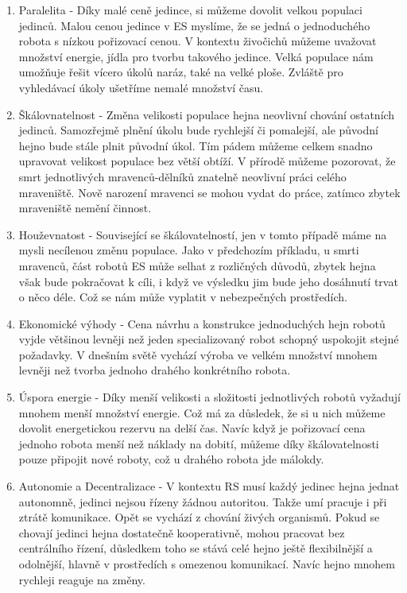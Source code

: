     \begin{enumerate}
        \item Paralelita - Díky malé ceně jedince, si můžeme dovolit velkou populaci jedinců. Malou cenou jedince v ES myslíme, že se jedná o jednoduchého robota s nízkou pořizovací cenou. V kontextu živočichů můžeme uvažovat množství energie, jídla pro tvorbu takového jedince. Velká populace nám umožňuje řešit vícero úkolů naráz, také na velké ploše. Zvláště pro vyhledávací úkoly ušetříme nemalé množství času. 
        \item Škálovnatelnost - Změna velikosti populace hejna neovlivní chování ostatních jedinců. Samozřejmě plnění úkolu bude rychlejší či pomalejší, ale původní hejno bude stále plnit původní úkol. Tím pádem můžeme celkem snadno upravovat velikost populace bez větší obtíží. V přírodě můžeme pozorovat, že smrt  jednotlivých mravenců-dělníků znatelně neovlivní práci celého mraveniště. Nově narození mravenci se mohou vydat do práce, zatímco zbytek mraveniště nemění činnost. 
        \item Houževnatost - Související se škálovatelností, jen v tomto případě máme na mysli necílenou změnu populace. Jako v předchozím příkladu, u smrti mravenců, část robotů ES může selhat z rozličných důvodů, zbytek hejna však bude pokračovat k cíli, i když ve výsledku jim bude jeho dosáhnutí trvat o něco déle. Což se nám může vyplatit v nebezpečných prostředích. 
        \item Ekonomické výhody - Cena návrhu a konstrukce jednoduchých hejn robotů vyjde většinou levněji než jeden specializovaný robot schopný uspokojit stejné požadavky. V dnešním světě vychází výroba ve velkém množství mnohem levněji než tvorba jednoho drahého konkrétního robota.
        \item Úspora energie - Díky menší velikosti a složitosti jednotlivých robotů vyžadují mnohem menší množství energie. Což má za důsledek, že si u nich můžeme dovolit energetickou rezervu na delší čas. Navíc když je pořizovací cena jednoho robota menší než náklady na dobití, můžeme díky škálovatelnosti pouze připojit nové roboty, což u drahého robota jde málokdy. 
        \item Autonomie a Decentralizace - V kontextu RS musí každý jedinec hejna jednat autonomně, jedinci nejsou řízeny žádnou autoritou. Takže umí pracuje i při ztrátě komunikace. Opět se vychází z chování živých organismů. Pokud se chovají jedinci hejna dostatečně kooperativně, mohou pracovat bez centrálního řízení, důsledkem toho se stává celé hejno ještě flexibilnější a odolnější, hlavně v prostředích s omezenou komunikací. Navíc hejno mnohem rychleji reaguje na změny. 
    \end{enumerate}
